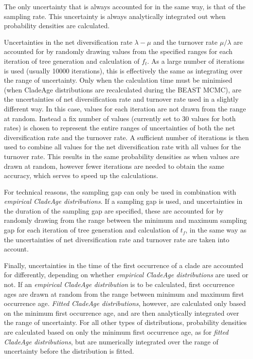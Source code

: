 \documentclass{article}
\begin{document}
The only uncertainty that is always accounted for in the same way, is that of the sampling rate. This uncertainty is always analytically integrated out when probability densities are calculated.

Uncertainties in the net diversification rate $\lambda - \mu$ and the turnover rate $\mu / \lambda$ are accounted for by randomly drawing values from the specified ranges for each iteration of tree generation and calculation of $f_t$. As a large number of iterations is used (usually 10000 iterations), this is effectively the same as integrating over the range of uncertainty. Only when the calculation time must be minimised (when CladeAge distributions are recalculated during the BEAST MCMC), are the uncertainties of net diversification rate and turnover rate used in a slightly different way. In this case, values for each iteration are not drawn from the range at random. Instead a fix number of values (currently set to 30 values for both rates) is chosen to represent the entire ranges of uncertainties of both the net diversification rate and the turnover rate. A sufficient number of iterations is then used to combine all values for the net diversification rate with all values for the turnover rate. This results in the same probability densities as when values are drawn at random, however fewer iterations are needed to obtain the same accuracy, which serves to speed up the calculations.

For technical reasons, the sampling gap can only be used in combination with \emph{empirical CladeAge distributions}. If a sampling gap is used, and uncertainties in the duration of the sampling gap are specified, these are accounted for by randomly drawing from the range between the minimum and maximum sampling gap for each iteration of tree generation and calculation of $t_f$, in the same way as the uncertainties of net diversification rate and turnover rate are taken into account.

Finally, uncertainties in the time of the first occurrence of a clade are accounted for differently, depending on whether \emph{empirical CladeAge distributions} are used or not. If an \emph{empirical CladeAge distribution} is to be calculated, first occurrence ages are drawn at random from the range between minimum and maximum first occurrence age. \emph{Fitted CladeAge distributions}, however, are calculated only based on the minimum first occurrence age, and are then analytically integrated over the range of uncertainty. For all other types of distributions, probability densities are calculated based on only the minimum first occurrence age, as for \emph{fitted CladeAge distributions}, but are numerically integrated over the range of uncertainty before the distribution is fitted.
\end{document}
